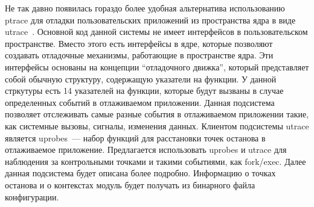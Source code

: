 Не так давно появилась гораздо более удобная альтернатива 
использованию ptrace для отладки пользовательских 
приложений из пространства ядра в виде utrace~\cite{utrace}. Основной 
код данной системы не имеет интерфейсов в пользовательском 
пространстве. Вместо этого есть интерфейсы в ядре, которые 
позволяют создавать отладочные механизмы, работающие в пространстве 
ядра. Эти интерфейсы основаны на концепции ``отладочного движка'', 
который представляет собой обычную структуру, содержащую 
указатели на функции. У данной стркутуры есть 14 указателей на
функции, которые будут вызваны в случае определенных событий в 
отлаживаемом приложении. Данная подсистема позволяет отслеживать 
самые разные события в отлаживаемом приложении такие, как системные 
вызовы, сигналы, изменения данных. Клиентом подсистемы utrace 
является uprobes~--- набор функций для расстановки точек
останова в отлаживаемое приложение. Предлагается использовать 
uprobes и utrace для наблюдения за контрольными точками и 
такими событиями, как fork/exec. Далее данная подсистема 
будет описана более подробно. Информацию о точках останова 
и о контекстах модуль будет получать из бинарного файла 
конфигурации. 

